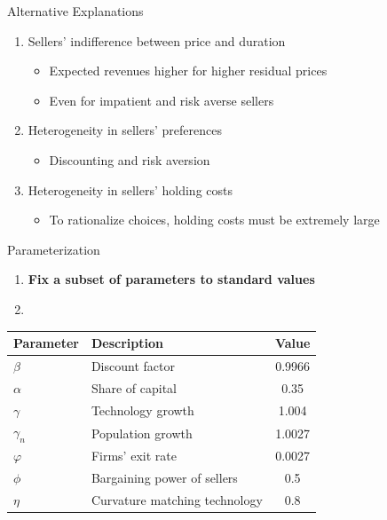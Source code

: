 \documentclass[english,xcolor=svgnames,aspectratio=169]{beamer}
\begin{document}
\begin{frame}{Alternative Explanations}

\begin{enumerate}
\item Sellers' indifference between price and duration
\begin{itemize}
\item Expected revenues higher for higher residual prices \smallskip
\item Even for impatient and risk averse sellers
\end{itemize} \medskip
\item Heterogeneity in sellers' preferences \smallskip
\begin{itemize}
\item Discounting and risk aversion
\end{itemize} \medskip
\item Heterogeneity in sellers' holding costs 
\begin{itemize}
\item To rationalize choices, holding costs must be extremely large
\end{itemize}
\end{enumerate}

\end{frame}



\begin{frame}{Parameterization}

{\color{dblue}{Two-step procedure}}
\begin{enumerate}
\item {\bf{Fix a subset of parameters to standard values}}
\item {\color{gray}{Calibrate targeting moments on model simulated data}}
\end{enumerate}
\bigskip
\begin{footnotesize}
\begin{table}
\begin{tabular}{llc}
\hline
\hline
{\bf{Parameter}} & {\bf{Description}} & {\bf{Value}}\\
\hline
$\beta$ & Discount factor & 0.9966 \\
$\alpha$ & Share of capital & 0.35 \\
$\gamma$ & Technology growth & 1.004 \\
$\gamma_n$ & Population growth & 1.0027 \\
$\varphi$ & Firms' exit rate & 0.0027 \\
$\phi$ & Bargaining power of sellers & 0.5\\
$\eta$ & Curvature matching technology & 0.8 \\
\hline
\hline
\end{tabular}
\end{table}
\end{footnotesize}
\end{frame}
\end{document}
